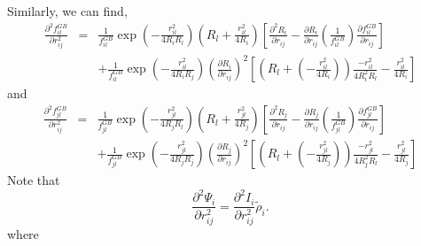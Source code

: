 \documentclass[12pt]{article}
\begin{document}
Similarly, we can find, 
\begin{eqnarray}
\label{eq:fGBil2ndderv1}
\frac{\partial^{2} f_{il}^{GB}}{\partial r_{ij}^{2}} & = & 
\frac{1}{f_{il}^{GB}}\exp(-\frac{r_{il}^2}{4R_{i}R_{l}})(R_{l} + \frac{r_{il}^{2}}{4R_{i}})\left[ \frac{\partial^{2} R_{i}}{\partial r_{ij}} - \frac{\partial R_{i}}{\partial r_{ij}}\left(\frac{1}{f_{il}^{GB}}\right) \frac{\partial f_{il}^{GB}}{\partial r_{ij}}\right] \\ \nonumber
& & + \frac{1}{f_{il}^{GB}}\exp(-\frac{r_{il}^2}{4R_{i}R_{j}})\left(\frac{\partial R_{i}}{\partial r_{ij}}\right)^{2}
\left[(R_{l} + \left(-\frac{r_{il}^{2}}{4R_{i}}\right))\frac{-r_{il}^{2}}{4R_{i}^{2}R_{l}} - \frac{r_{il}^{2}}{4R_{i}} \right]
\end{eqnarray}
and
\begin{eqnarray}
\label{eq:fGBjl2ndderv1}
\frac{\partial^{2} f_{jl}^{GB}}{\partial r_{ij}^{2}} & = & 
\frac{1}{f_{jl}^{GB}}\exp(-\frac{r_{jl}^2}{4R_{j}R_{l}})(R_{l} + \frac{r_{jl}^{2}}{4R_{j}})\left[ \frac{\partial^{2} R_{j}}{\partial r_{ij}} - \frac{\partial R_{j}}{\partial r_{ij}}\left(\frac{1}{f_{jl}^{GB}}\right) \frac{\partial f_{jl}^{GB}}{\partial r_{ij}}\right] \\ \nonumber
& & + \frac{1}{f_{jl}^{GB}}\exp(-\frac{r_{jl}^2}{4R_{j}R_{j}})\left(\frac{\partial R_{j}}{\partial r_{ij}}\right)^{2}
\left[(R_{l} + \left(-\frac{r_{jl}^{2}}{4R_{j}}\right))\frac{-r_{jl}^{2}}{4R_{j}^{2}R_{l}} - \frac{r_{jl}^{2}}{4R_{j}} \right]
\end{eqnarray}
Note that
\begin{equation}
\frac{\partial^{2}{\Psi}_{i}}{\partial r_{ij}^{2}} = \frac{\partial^{2}I_{i}}{\partial r_{ij}^{2}}{\tilde{\rho}_{i}}.
\end{equation}
where
\end{document}
